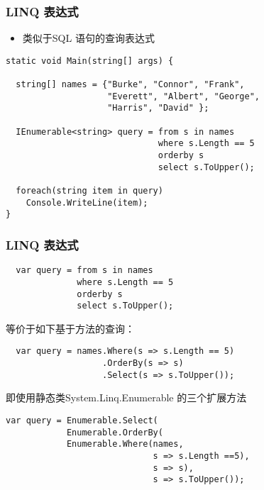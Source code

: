 \begin{frame}[fragile]
\frametitle{LINQ 表达式}
\begin{itemize}
\item 类似于SQL 语句的查询表达式
\end{itemize}
\begin{lstlisting}
static void Main(string[] args) {

  string[] names = {"Burke", "Connor", "Frank", 
                    "Everett", "Albert", "George", 
                    "Harris", "David" };

  IEnumerable<string> query = from s in names
                              where s.Length == 5
                              orderby s
                              select s.ToUpper();
  
  foreach(string item in query)
    Console.WriteLine(item);
}
\end{lstlisting}

\end{frame}

\begin{frame}[fragile]
\frametitle{LINQ 表达式}

\begin{lstlisting}
  var query = from s in names
              where s.Length == 5
              orderby s
              select s.ToUpper();
\end{lstlisting}
\pause

等价于如下基于方法的查询：
\begin{lstlisting}
  var query = names.Where(s => s.Length == 5)
                   .OrderBy(s => s)
                   .Select(s => s.ToUpper());
\end{lstlisting}
\pause

即使用静态类System.Linq.Enumerable 的三个扩展方法
\begin{lstlisting}
var query = Enumerable.Select(
            Enumerable.OrderBy(
            Enumerable.Where(names, 
                             s => s.Length ==5),
                             s => s),
                             s => s.ToUpper());
\end{lstlisting}
\end{frame}


